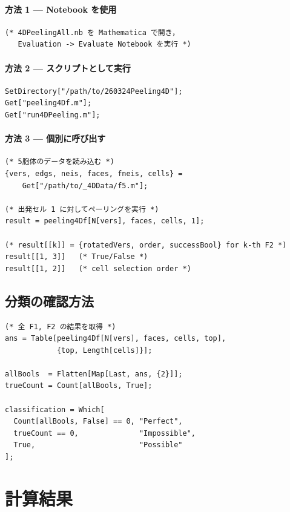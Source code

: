 \documentclass[12pt,a4paper]{article}
\theoremstyle{definition}
\begin{document}
\paragraph{方法 1 --- Notebook を使用}
\begin{lstlisting}
(* 4DPeelingAll.nb を Mathematica で開き，
   Evaluation -> Evaluate Notebook を実行 *)
\end{lstlisting}

\paragraph{方法 2 --- スクリプトとして実行}
\begin{lstlisting}
SetDirectory["/path/to/260324Peeling4D"];
Get["peeling4Df.m"];
Get["run4DPeeling.m"];
\end{lstlisting}

\paragraph{方法 3 --- 個別に呼び出す}
\begin{lstlisting}
(* 5胞体のデータを読み込む *)
{vers, edgs, neis, faces, fneis, cells} =
    Get["/path/to/_4DData/f5.m"];

(* 出発セル 1 に対してペーリングを実行 *)
result = peeling4Df[N[vers], faces, cells, 1];

(* result[[k]] = {rotatedVers, order, successBool} for k-th F2 *)
result[[1, 3]]   (* True/False *)
result[[1, 2]]   (* cell selection order *)
\end{lstlisting}

\subsection{分類の確認方法}

\begin{lstlisting}
(* 全 F1, F2 の結果を取得 *)
ans = Table[peeling4Df[N[vers], faces, cells, top],
            {top, Length[cells]}];

allBools  = Flatten[Map[Last, ans, {2}]];
trueCount = Count[allBools, True];

classification = Which[
  Count[allBools, False] == 0, "Perfect",
  trueCount == 0,              "Impossible",
  True,                        "Possible"
];
\end{lstlisting}


\section{計算結果}
\end{document}
